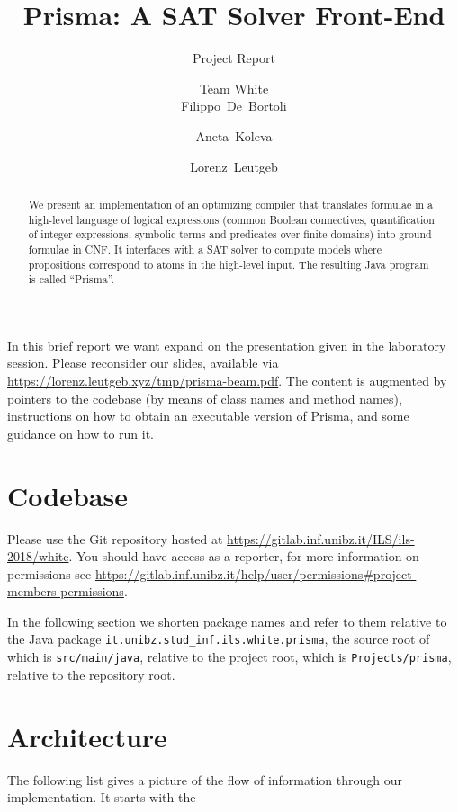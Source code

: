 \documentclass{llncs}
\title{Prisma: A SAT Solver Front-End}
\subtitle{Project Report}
\author{Team White\\[2mm]Filippo~De~Bortoli \and Aneta~Koleva \and Lorenz~Leutgeb}
\institute{Free University of Bozen-Bolzano\\[3mm] \texttt{\{\href{mailto:filippo.debortoli@stud-inf.unibz.it}{filippo.debortoli},\href{mailto:aneta.koleva@stud-inf.unibz.it}{aneta.koleva},\href{mailto:lorenz.leutgeb@stud-inf.unibz.it}{lorenz.leutgeb}\}\newline @stud-inf.unibz.it}}
\begin{document}
  \maketitle

  \begin{abstract}
We present an implementation of an optimizing compiler that translates formulae in a high-level language of logical expressions (common Boolean connectives, quantification of integer expressions, symbolic terms and predicates over finite domains) into ground formulae in CNF. It interfaces with a SAT solver to compute models where propositions correspond to atoms in the high-level input. The resulting Java program is called \enquote{Prisma}.
  \end{abstract}

%
%
%
%
%

In this brief report we want expand on the presentation given in the laboratory session. Please reconsider our slides, available via \url{https://lorenz.leutgeb.xyz/tmp/prisma-beam.pdf}. The content is augmented by pointers to the codebase (by means of class names and method names), instructions on how to obtain an executable version of Prisma, and some guidance on how to run it.

\section{Codebase}

Please use the Git repository hosted at \url{https://gitlab.inf.unibz.it/ILS/ils-2018/white}. You should have access as a reporter, for more information on permissions see \url{https://gitlab.inf.unibz.it/help/user/permissions#project-members-permissions}.

In the following section we shorten package names and refer to them relative to the Java package \texttt{it.unibz.stud\_inf.ils.white.prisma}, the source root of which is \texttt{src/main/java}, relative to the project root, which is \texttt{Projects/prisma}, relative to the repository root.

\section{Architecture}

The following list gives a picture of the flow of information through our implementation. It starts with the 
\end{document}
